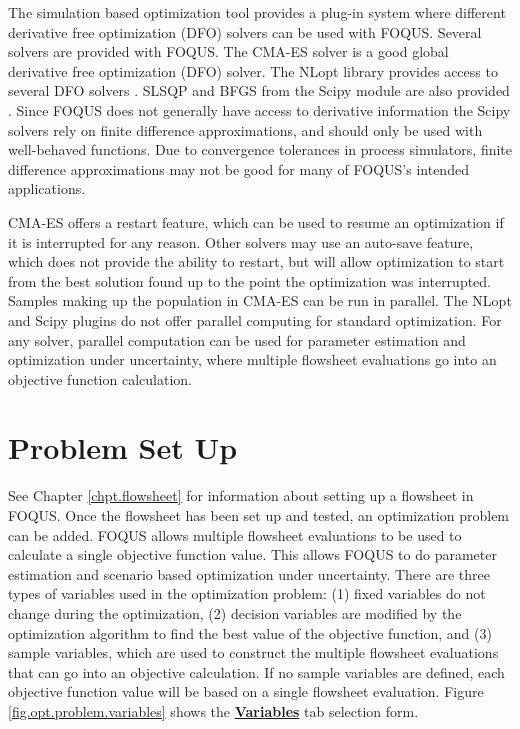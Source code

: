 The simulation based optimization tool provides a plug-in system where different derivative free optimization (DFO) solvers can be used with FOQUS. Several solvers are provided with FOQUS. The CMA-ES solver \citep{Hansen_2006} is a good global derivative free optimization (DFO) solver. The NLopt library provides access to several DFO solvers \citep{Johnson_2015}. SLSQP and BFGS from the Scipy module are also provided \citep{Scipy_2015}. Since FOQUS does not generally have access to derivative information the Scipy solvers rely on finite difference approximations, and should only be used with well-behaved functions. Due to convergence tolerances in process simulators, finite difference approximations may not be good for many of FOQUS's intended applications.

CMA-ES offers a restart feature, which can be used to resume an optimization if it is interrupted for any reason. Other solvers may use an auto-save feature, which does not provide the ability to restart, but will allow optimization to start from the best solution found up to the point the optimization was interrupted.  Samples making up the population in CMA-ES can be run in parallel. The NLopt and Scipy plugins do not offer parallel computing for standard optimization. For any solver, parallel computation can be used for parameter estimation and optimization under uncertainty, where multiple flowsheet evaluations go into an objective function calculation.
\section{Problem Set Up}

See Chapter \ref{chpt.flowsheet} for information about setting up a flowsheet in FOQUS. Once the flowsheet has been set up and tested, an optimization problem can be added. FOQUS allows multiple flowsheet evaluations to be used to calculate a single objective function value. This allows FOQUS to do parameter estimation and scenario based optimization under uncertainty.  There are three types of variables used in the optimization problem: (1) fixed variables do not change during the optimization, (2) decision variables are modified by the optimization algorithm to find the best value of the objective function, and (3) sample variables, which are used to construct the multiple flowsheet evaluations that can go into an objective calculation. If no sample variables are defined, each objective function value will be based on a single flowsheet evaluation.  Figure \ref{fig.opt.problem.variables} shows the \textbf{\underline{Variables}} tab selection form.

